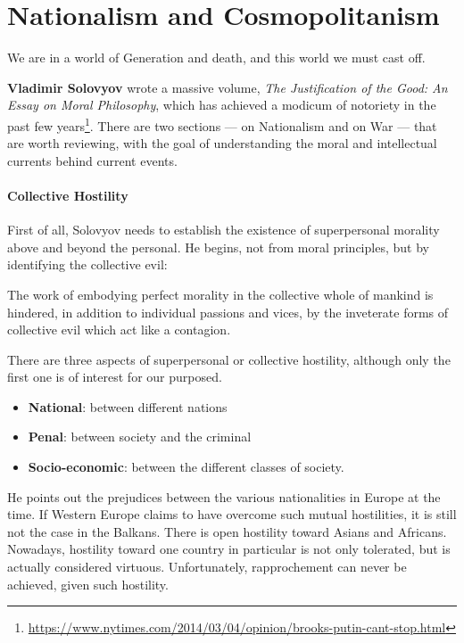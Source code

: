 \section{Nationalism and Cosmopolitanism}

\begin{quotex}
We are in a world of Generation and death, and this world we must cast off. 

\end{quotex}
\textbf{Vladimir Solovyov} wrote a massive volume, \textit{The Justification of the Good: An Essay on Moral Philosophy}, which has achieved a modicum of notoriety in the past few years\footnote{\url{https://www.nytimes.com/2014/03/04/opinion/brooks-putin-cant-stop.html}}. There are two sections — on Nationalism and on War — that are worth reviewing, with the goal of understanding the moral and intellectual currents behind current events.

\paragraph{Collective Hostility}
First of all, Solovyov needs to establish the existence of superpersonal morality above and beyond the personal. He begins, not from moral principles, but by identifying the collective evil:

\begin{quotex}
The work of embodying perfect morality in the collective whole of mankind is hindered, in addition to individual passions and vices, by the inveterate forms of collective evil which act like a contagion.

\end{quotex}
There are three aspects of superpersonal or collective hostility, although only the first one is of interest for our purposed.

\begin{itemize}
\item \textbf{National}: between different nations 
\item \textbf{Penal}: between society and the criminal 
\item \textbf{Socio-economic}: between the different classes of society. 
\end{itemize}
He points out the prejudices between the various nationalities in Europe at the time. If Western Europe claims to have overcome such mutual hostilities, it is still not the case in the Balkans. There is open hostility toward Asians and Africans. Nowadays, hostility toward one country in particular is not only tolerated, but is actually considered virtuous. Unfortunately, rapprochement can never be achieved, given such hostility.

